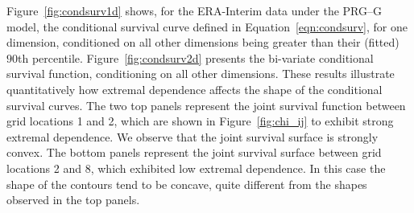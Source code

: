 Figure~\ref{fig:condsurv1d} shows, for the ERA-Interim data under the PRG--G model,  
    the conditional survival curve defined in Equation~\ref{eqn:condsurv}, for one dimension, 
    conditioned on all other dimensions being greater than their (fitted) $90$th percentile. 
    Figure~\ref{fig:condsurv2d} presents the bi-variate conditional survival function,
    conditioning on all other dimensions.  These results illustrate quantitatively how extremal dependence
    affects the shape of the conditional survival curves.  The two top panels represent the joint survival function 
    between grid locations 1 and 2, which are shown in Figure~\ref{fig:chi_ij} to exhibit strong
    extremal dependence.  We observe that the joint survival surface 
    is strongly convex.  The bottom panels represent the joint survival surface between grid locations 2 and 8, 
    which exhibited low extremal dependence.  In this case the shape of the contours tend to be concave, quite different from the shapes observed in the top panels.
